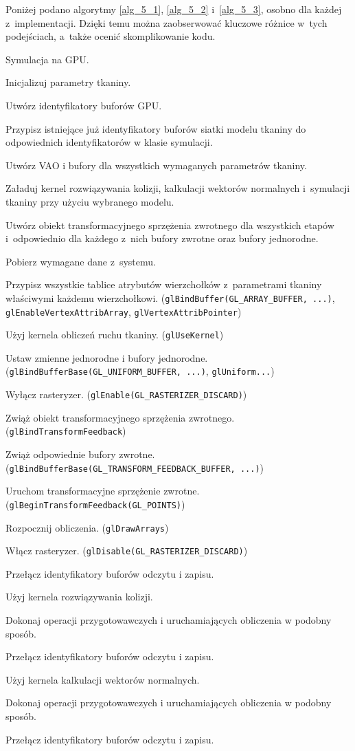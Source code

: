 		Poniżej podano algorytmy \ref{alg_5_1}, \ref{alg_5_2} i~\ref{alg_5_3}, osobno dla każdej z~implementacji. Dzięki temu można zaobserwować kluczowe różnice w~tych podejściach, a~także ocenić skomplikowanie kodu.
		\newpage
		\begin{algorithm}[H]
			\label{alg_5_1}
			\caption{Symulacja na GPU.}	
			
			Inicjalizuj parametry tkaniny.
			
			Utwórz identyfikatory buforów GPU.
			
			Przypisz istniejące już identyfikatory buforów siatki modelu tkaniny do odpowiednich identyfikatorów w klasie symulacji.
			
			Utwórz VAO i bufory dla wszystkich wymaganych parametrów tkaniny.
			
			Załaduj kernel rozwiązywania kolizji, kalkulacji wektorów normalnych i~symulacji tkaniny przy użyciu wybranego modelu.
			
			Utwórz obiekt transformacyjnego sprzężenia zwrotnego dla wszystkich etapów i~odpowiednio dla każdego z~nich bufory zwrotne oraz bufory jednorodne.

			{
				Pobierz wymagane dane z~systemu. 
				
				Przypisz wszystkie tablice atrybutów wierzchołków z~parametrami tkaniny właściwymi każdemu wierzchołkowi. (\texttt{glBindBuffer(GL\_ARRAY\_BUFFER, ...)}, \texttt{glEnableVertexAttribArray}, \texttt{glVertexAttribPointer})
				
				Użyj kernela obliczeń ruchu tkaniny. (\texttt{glUseKernel})
				
				Ustaw zmienne jednorodne i bufory jednorodne. (\texttt{glBindBufferBase(GL\_UNIFORM\_BUFFER, ...)}, \texttt{glUniform...})
				
				Wyłącz rasteryzer. (\texttt{glEnable(GL\_RASTERIZER\_DISCARD)})
				
				Zwiąż obiekt transformacyjnego sprzężenia zwrotnego. (\texttt{glBindTransformFeedback})
				
				Zwiąż odpowiednie bufory zwrotne. (\texttt{glBindBufferBase(GL\_TRANSFORM\_FEEDBACK\_BUFFER, ...)})
				
				Uruchom transformacyjne sprzężenie zwrotne. (\texttt{glBeginTransformFeedback(GL\_POINTS)})
				
				Rozpocznij obliczenia. (\texttt{glDrawArrays})
				
				Włącz rasteryzer. (\texttt{glDisable(GL\_RASTERIZER\_DISCARD)})
				
				Przełącz identyfikatory buforów odczytu i zapisu.
				
				Użyj kernela rozwiązywania kolizji.
				
				Dokonaj operacji przygotowawczych i uruchamiających obliczenia w podobny sposób.
				
				Przełącz identyfikatory buforów odczytu i zapisu.
				
				Użyj kernela kalkulacji wektorów normalnych.
				
				Dokonaj operacji przygotowawczych i uruchamiających obliczenia w podobny sposób.
				
				Przełącz identyfikatory buforów odczytu i zapisu.
			}
		\end{algorithm}
